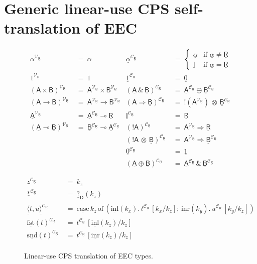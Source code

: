 \documentclass{LMCS}
\newcommand{\comptype}[1]{\underline{#1}}
\newcommand{\VconstA}{\alpha}
\newcommand{\CconstA}{\comptype{\alpha}}
\newcommand{\VA}{\mathsf{A}}
\newcommand{\VB}{\mathsf{B}}
\newcommand{\CA}{\comptype{\mathsf{A}}}
\newcommand{\CB}{\comptype{\mathsf{B}}}
\newcommand{\CD}{\comptype{\mathsf{D}}}
\newcommand{\CR}{\comptype{\mathsf{R}}}
\newcommand{\CI}{\comptype{\mathsf{I}}}
\newcommand{\Vone}{1}
\newcommand{\Vprod}{\times}
\newcommand{\Vfun}{\to}
\newcommand{\lpop}{\multimap}
\newcommand{\Cone}{\comptype{1}}
\newcommand{\Cprod}{\,\&\,}
\newcommand{\Cfun}{\Rightarrow}
\newcommand{\Cbang}[1]{{! #1}}
\newcommand{\Ccopower}[2]{! #1 \, {\otimes} \, #2}
\newcommand{\Czero}{\comptype{0}}
\newcommand{\Cplus}{\oplus}
\newcommand{\compop}[1]{\underline{#1}}
\newcommand{\Cstar}{\compop{*}}
\newcommand{\Cpair}[2]{\compop{\langle} #1 , #2 \compop{\rangle}}
\newcommand{\Cfst}[1]{\compop{\mathrm{fst}}(#1)}
\newcommand{\Csnd}[1]{\compop{\mathrm{snd}}(#1)}
\newcommand{\Cimagetype}[2]{\compop{?}_{#1}(#2)}
\newcommand{\Cinl}[1]{\compop{\mathrm{inl}}(#1)}
\newcommand{\Cinr}[1]{\compop{\mathrm{inr}}(#1)}
\newcommand{\Ccase}[5]{\compop{\mathrm{case}} \, #1 \,\mathrm{of}\,( \Cinl{#2}. \, #3 ; \, \Cinr{#4}. \, #5)}
\newcommand{\CpsVT}[1]{#1^{\mathcal{V}_{\CR}}}
\newcommand{\CpsCT}[1]{#1^{\mathcal{C}_{\CR}}}
\begin{document}
\section{Generic linear-use CPS self-translation of EEC}
\label{section:canonical}


\begin{figure}[h!]
\vspace*{10pt}
\begin{align*}
\CpsVT{\VconstA} & \: = \: \VconstA  &
\CpsCT{\CconstA} & \: = \: \begin{cases} \CconstA & \text{if $\CconstA \neq \CR$} \\
                                          \CI & \text{if $\CconstA = \CR$} \end{cases}
\\
\CpsVT{\Vone} & \: = \: \Vone &
\CpsCT{\Cone} & \: = \: \Czero \\
\CpsVT{(\VA \Vprod \VB)} & \: = \: \CpsVT{\VA} \Vprod \CpsVT{\VB} &
\CpsCT{(\CA \Cprod \CB)} & \: = \:  \CpsCT{\CA} \Cplus \CpsCT{\CB} \\
\CpsVT{(\VA \Vfun \VB)} & \: = \: \CpsVT{\VA} \Vfun \CpsVT{\VB} &
\CpsCT{(\VA \Cfun \CB)} & \: = \: {\Ccopower{(\CpsVT{\VA})}{\CpsCT{\CB}}} \\
\CpsVT{\CA} & \: = \: \CpsCT{\CA} \lpop \CR &
\CpsCT{\CI} & \: = \: {\CR} \\
\CpsVT{(\CA \lpop \CB)} & \: = \:  \CpsCT{\CB} \lpop \CpsCT{\CA}  &
\CpsCT{(\Cbang{\VA})} & \: =\:  \CpsVT{\VA} \Cfun  \CR \\
& &
\CpsCT{(\Ccopower{\VA}{\CB})} & \: = \: \CpsVT{\VA} \Cfun \CpsCT{\CB} \\
& &
\CpsCT{\Czero} & \: = \: \Cone \\
& &
\CpsCT{(\CA \Cplus \CB)} & \: = \: \CpsCT{\CA} \Cprod  \CpsCT{\CB} 
\end{align*}
\caption{Linear-use CPS translation of EEC types.}
\label{fig:cps:type}
\vspace*{10pt}
\begin{align*}
\CpsCT{z}  & \: = \:  k_z
\\
\CpsCT{\Cstar}  & \: = \:  \Cimagetype{\CD}{k_z}
\\
\CpsCT{\Cpair{t}{u}}  & \: = \:  
   {\Ccase{k_z}{k_x}{\CpsCT{t}\, [k_x/k_z]}{k_y}{\CpsCT{u}\,[k_y/k_z]}} 
\\
\CpsCT{\Cfst{t}}  & \: = \:  
   \CpsCT{t}\, [\Cinl{k_z}/k_z]
\\
\CpsCT{\Csnd{t}}  & \: = \:  
   \CpsCT{t}\, [\Cinr{k_z}/k_z]
\\

\end{align*}
\end{figure}
\end{document}
